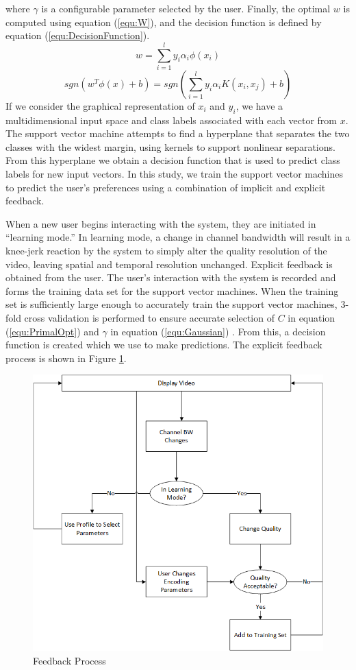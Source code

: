 \documentclass[a4paper,12pt]{article}
\begin{document}
where $\gamma$ is a configurable parameter selected by the user. Finally, the optimal $w$ is computed using equation (\ref{equ:W}), and the decision function is defined by equation (\ref{equ:DecisionFunction}).
\begin{equation}
\label{equ:W}
w = \sum_{i=1}^{l} y_i \alpha_i \phi (x_i)
\end{equation}
\begin{equation}
\label{equ:DecisionFunction}
sgn(w^T\phi (x) + b) = sgn(\sum_{i=1}^{l} y_i\alpha_i K(x_i, x_j) +b)
\end{equation}
If we consider the graphical representation of $x_i$ and $y_i$, we have a multidimensional input space and class labels associated with each vector from $x$. The support vector machine attempts to find a hyperplane that separates the two classes with the widest margin, using kernels to support nonlinear separations. From this hyperplane we obtain a decision function that is used to predict class labels for new input vectors. In this study, we train the support vector machines to predict the user’s preferences using a combination of implicit and explicit feedback. 

When a new user begins interacting with the system, they are initiated in ``learning mode.'' In learning mode, a change in channel bandwidth will result in a knee-jerk reaction by the system to simply alter the quality resolution of the video, leaving spatial and temporal resolution unchanged. Explicit feedback is obtained from the user. The user's interaction with the system is recorded and forms the training data set for the support vector machines. When the training set is sufficiently large enough to accurately train the support vector machines, 3-fold cross validation is performed to ensure accurate selection of $C$ in equation (\ref{equ:PrimalOpt}) and $\gamma$ in equation (\ref{equ:Gaussian}) \cite{LibSVM}. From this, a decision function is created which we use to make predictions. The explicit feedback process is shown in Figure \ref{fig:Feedback}.
\begin{figure}[h]
\centering
\includegraphics[width=0.5\linewidth]{BandwidthChangeDecisionTree.png}
\caption{Feedback Process}
\label{fig:Feedback}
\end{figure}
\end{document}
